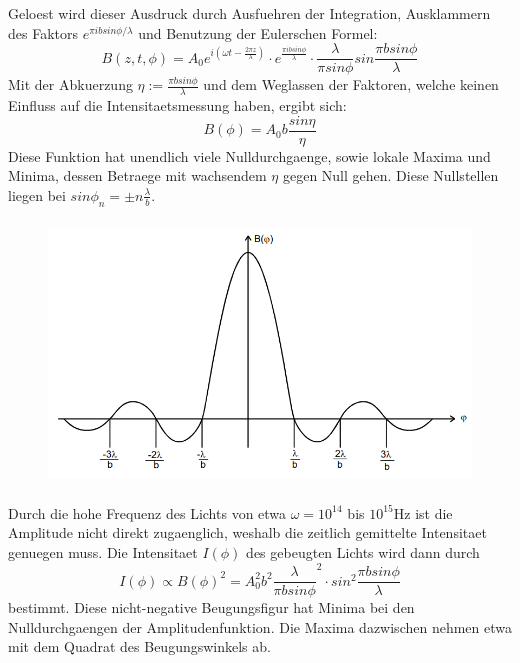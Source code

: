 Geloest wird dieser Ausdruck durch Ausfuehren der Integration, Ausklammern des Faktors $e^{\pi ibsin\phi/\lambda}$ und Benutzung der Eulerschen Formel:
\begin{equation*}
    B(z, t, \phi)=A_0e^{i(\omega t-\frac{2\pi z}{\lambda})}\cdot e^{\frac{\pi ibsin\phi}{\lambda}}\cdot\frac{\lambda}{\pi sin\phi}sin\frac{\pi bsin\phi}{\lambda}
\end{equation*}
Mit der Abkuerzung $\eta:=\frac{\pi bsin\phi}{\lambda}$ und dem Weglassen der Faktoren, welche keinen Einfluss auf die Intensitaetsmessung haben, ergibt sich:
\begin{equation*}
    B(\phi)=A_0b\frac{sin\eta}{\eta}
\end{equation*}
Diese Funktion hat unendlich viele Nulldurchgaenge, sowie lokale Maxima und Minima, dessen Betraege mit wachsendem $\eta$ gegen Null gehen. Diese Nullstellen liegen bei $sin\phi_n=\pm n\frac{\lambda}{b}$.
\begin{figure}[H]
    \centering
    \captionsetup{justification=centering}
    \includegraphics[height=7cm]{"Amplitude_BeugungSpalt.png"}
    \label{Fig:Amplitude}
\end{figure}
Durch die hohe Frequenz des Lichts von etwa $\omega=10^{14}$ bis $10^15$Hz ist die Amplitude nicht direkt zugaenglich, weshalb die zeitlich gemittelte Intensitaet genuegen muss. Die Intensitaet $I(\phi)$ des gebeugten Lichts wird dann durch 
\begin{equation*}
    I(\phi ) \propto B(\phi)^2=A_0^2 b^2 {\frac{\lambda}{\pi bsin\phi}}^2\cdot sin^2{\frac{\pi bsin\phi}{\lambda}}
\end{equation*}
bestimmt. Diese nicht-negative Beugungsfigur hat Minima bei den Nulldurchgaengen der Amplitudenfunktion. Die Maxima dazwischen nehmen etwa mit dem Quadrat des Beugungswinkels ab.
